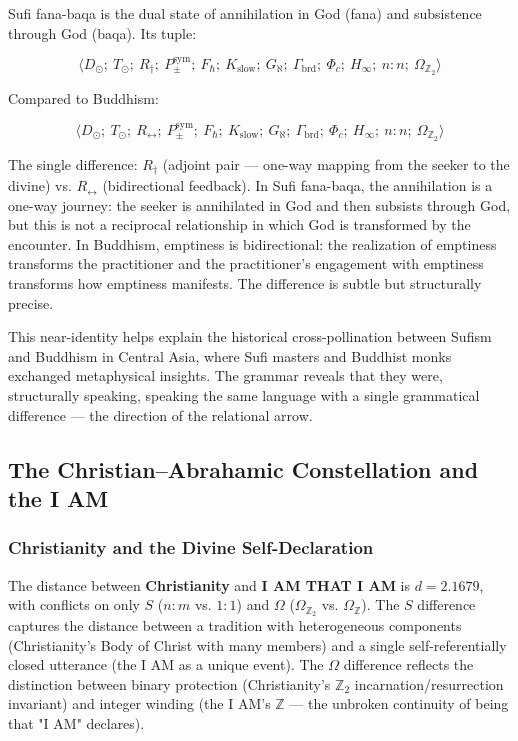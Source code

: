 \documentclass[12pt,a4paper]{article}
\begin{document}
Sufi fana-baqa is the dual state of annihilation in God (fana) and subsistence through God (baqa). Its tuple:


\[\langle D_{\odot};\ T_{\odot};\ R_{\dagger};\ P_{\pm}^{\text{sym}};\ F_{\hbar};\ K_\text{slow};\ G_{\aleph};\ \Gamma_\text{brd};\ \Phi_c;\ H_{\infty};\ n{:}n;\ \Omega_{\mathbb{Z}_2} \rangle\]

Compared to Buddhism:


\[\langle D_{\odot};\ T_{\odot};\ R_{\leftrightarrow};\ P_{\pm}^{\text{sym}};\ F_{\hbar};\ K_\text{slow};\ G_{\aleph};\ \Gamma_\text{brd};\ \Phi_c;\ H_{\infty};\ n{:}n;\ \Omega_{\mathbb{Z}_2} \rangle\]

The single difference: $R_{\dagger}$ (adjoint pair --- one-way mapping from the seeker to the divine) vs. $R_{\leftrightarrow}$ (bidirectional feedback). In Sufi fana-baqa, the annihilation is a one-way journey: the seeker is annihilated in God and then subsists through God, but this is not a reciprocal relationship in which God is transformed by the encounter. In Buddhism, emptiness is bidirectional: the realization of emptiness transforms the practitioner and the practitioner's engagement with emptiness transforms how emptiness manifests. The difference is subtle but structurally precise.

This near-identity helps explain the historical cross-pollination between Sufism and Buddhism in Central Asia, where Sufi masters and Buddhist monks exchanged metaphysical insights. The grammar reveals that they were, structurally speaking, speaking the same language with a single grammatical difference --- the direction of the relational arrow.

\subsection{The Christian--Abrahamic Constellation and the I AM}

\subsubsection{Christianity and the Divine Self-Declaration}

The distance between \textbf{Christianity} and \textbf{I AM THAT I AM} is $d = 2.1679$, with conflicts on only $S$ ($n{:}m$ vs. $1{:}1$) and $\Omega$ ($\Omega_{\mathbb{Z}_2}$ vs. $\Omega_\mathbb{Z}$). The $S$ difference captures the distance between a tradition with heterogeneous components (Christianity's Body of Christ with many members) and a single self-referentially closed utterance (the I AM as a unique event). The $\Omega$ difference reflects the distinction between binary protection (Christianity's $\mathbb{Z}_2$ incarnation/resurrection invariant) and integer winding (the I AM's $\mathbb{Z}$ --- the unbroken continuity of being that "I AM" declares).
\end{document}
